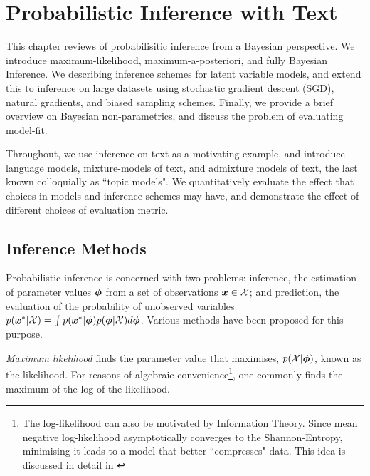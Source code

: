 

\newcommand \xdn  { { \vv{x}_{dn} } }
\newcommand \zd   { { \vv{z}_d } }
\newcommand \qfam { { \mathcal{Q} } }
\newcommand \xdat { { \mathcal{X} } }
\newcommand \zdat { { \mathcal{Z} } }
\newcommand \xnew { { \vv{x}^{*} } }
\newcommand \znew { { \vv{z}^{*} } }
\newcommand \param { { \vv{\phi} } }
\newcommand \params { { \Phi } }
\newcommand \ml[1] { { {#1}_{\text{ML}} } } 
\newcommand \map[1] { { {#1}_{\text{MAP}} } } 
\newcommand \quarter { { \oneover{4} } }
\newcommand \eighth { { \oneover{8} } }
\newcommand \fqt[1] { { \mathcal{F}\left( {#1} \right) } }
\newcommand \joint { { p(\xdat, \zdat | \params) } }
\newcommand \logjoint { { \ln \joint } }
\newcommand \exlogjoint[1] { { \ex{\logjoint}{{#1}} } }

\chapter{Probabilistic Inference with Text}
This chapter reviews of probabilisitic inference from a Bayesian perspective. We introduce maximum-likelihood, maximum-a-posteriori, and fully Bayesian Inference. We describing inference schemes for latent variable models, and extend this to inference on large datasets using stochastic gradient descent (SGD), natural gradients, and biased sampling schemes. Finally, we provide a brief overview on Bayesian non-parametrics, and discuss the problem of evaluating model-fit.

Throughout, we use inference on text as a motivating example, and introduce language models, mixture-models of text, and admixture models of text, the last known colloquially as ``topic models". We quantitatively evaluate the effect that choices in models and inference schemes may have, and demonstrate the effect of different choices of evaluation metric.
\section{Inference Methods}

Probabilistic inference is concerned with two problems: inference, the estimation of parameter values $\param$ from a set of observations $\vv{x} \in \xdat$; and prediction, the evaluation of the probability of unobserved variables $p(\xnew | \xdat) = \int p(\xnew | \param) p(\param | \xdat) d\param$. Various methods have been proposed for this purpose.


\emph{Maximum likelihood} finds the parameter value that maximises, $p(\xdat|\param)$, known as the likelihood. For reasons of algebraic convenience\footnote{The log-likelihood can also be motivated by Information Theory. Since mean negative log-likelihood asymptotically converges to the Shannon-Entropy, minimising it leads to a model that better ``compresses" data. This idea is discussed in detail in \cite{MacKay2005InfoTheory} }, one commonly finds the maximum of the log of the likelihood.

